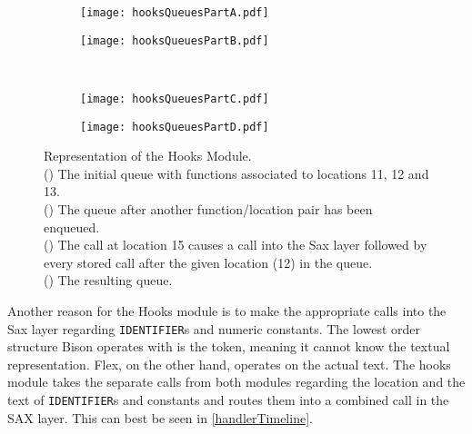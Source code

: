 \documentclass[12pt]{report}
\begin{document}
\begin{figure}
\begin{center}
\begin{subfigure}[t]{.4\linewidth}
	\caption{}
	\label{hooksQueuesA}
	\texttt{[image: hooksQueuesPartA.pdf]}
\end{subfigure}
\begin{subfigure}[t]{.4\linewidth}
	\caption{}
	\label{hooksQueuesB}
	\texttt{[image: hooksQueuesPartB.pdf]}
\end{subfigure} \\
\vspace{4mm}
\begin{subfigure}[t]{.4\linewidth}
	\caption{}
	\label{hooksQueuesC}
	\texttt{[image: hooksQueuesPartC.pdf]}
\end{subfigure}
\begin{subfigure}[t]{.4\linewidth}
	\caption{}
	\label{hooksQueuesD}
	\texttt{[image: hooksQueuesPartD.pdf]}
\end{subfigure}
\end{center}
\caption[Representation of the Hooks Module]{Representation of the Hooks Module. \\() The initial queue with functions associated to locations 11, 12 and 13. \\() The queue after another function\slash location pair has been enqueued. \\ () The call at location 15 causes a call into the Sax layer followed by every stored call after the given location (12) in the queue. \\ () The resulting queue.}
\label{hooksQueues}
\end{figure}

Another reason for the Hooks module is to make the appropriate calls into the Sax layer regarding 
\lstinline{IDENTIFIER}s and numeric constants. The lowest order structure Bison operates with is the 
token, meaning it cannot know the textual representation. Flex, on the other hand, operates on the actual 
text. The hooks module takes the separate calls from both modules regarding the location and the text of 
\lstinline{IDENTIFIER}s and constants and routes them into a combined call in the SAX layer. This can 
best be seen in \autoref{handlerTimeline}.
\end{document}
